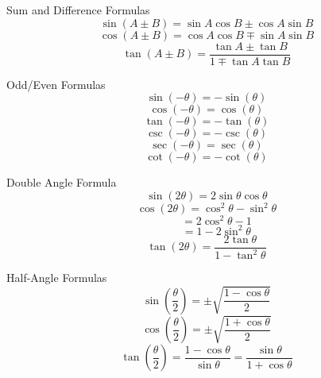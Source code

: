\documentclass[12pt]{article}
\numberwithin{equation}{subsection}
\newcommand{\sinp}[1]{\sin\left( #1 \right)}
\newcommand{\cosp}[1]{\cos\left( #1 \right)}
\newcommand{\tanp}[1]{\tan\left( #1 \right)}
\newcommand{\secp}[1]{\sec\left( #1 \right)}
\newcommand{\cscp}[1]{\csc\left( #1 \right)}
\newcommand{\cotp}[1]{\cot\left( #1 \right)}
\begin{document}
\newpage
Sum and Difference Formulas
\begin{equation}
\sinp{A \pm B}= \sin{A} \cos{B} \pm \cos{A} \sin{B}
\end{equation}
\begin{equation}
\cosp{A \pm B}= \cos{A} \cos{B} \mp \sin{A} \sin{B}
\end{equation}
\begin{equation}
\tanp{A \pm B}=\frac{\tan{A} \pm \tan{B}}{1 \mp \tan{A} \tan{B}}
\end{equation}

Odd/Even Formulas
\begin{equation}
\sinp{-\theta}=-\sinp{\theta}
\end{equation}
\begin{equation}
\cosp{-\theta}=\cosp{\theta}
\end{equation}
\begin{equation}
\tanp{-\theta}=-\tanp{\theta}
\end{equation}
\begin{equation}
\cscp{-\theta}=-\cscp{\theta}
\end{equation}
\begin{equation}
\secp{-\theta}=\secp{\theta}
\end{equation}
\begin{equation}
\cotp{-\theta}=-\cotp{\theta}
\end{equation}

Double Angle Formula
\begin{equation}
\sinp{2\theta}=2\sin{\theta} \cos{\theta}
\end{equation}
\begin{equation}
\cosp{2\theta}=\cos^2{\theta}-\sin^2{\theta}
\end{equation}
\begin{equation}
\ \ \ \ \ \ \ \ = 2\cos^2\theta - 1
\end{equation}
\begin{equation}
\ \ \ \ \ \ \ \ = 1 - 2\sin^2 \theta
\end{equation}
\begin{equation}
\tanp{2\theta}=\frac{2\tan{\theta}}{1-\tan^2{\theta}}
\end{equation}

Half-Angle Formulas
\begin{equation}
\sinp{\frac{\theta}{2}}= \pm \sqrt{\frac{1-\cos{\theta}}{2}}
\end{equation}
\begin{equation}
\cosp{\frac{\theta}{2}}= \pm \sqrt{\frac{1+\cos{\theta}}{2}}
\end{equation}
\begin{equation}
\tanp{\frac{\theta}{2}}= \frac{1-\cos{\theta}}{\sin{\theta}}=\frac{\sin{\theta}}{1+\cos{\theta}}
\end{equation}
\end{document}
